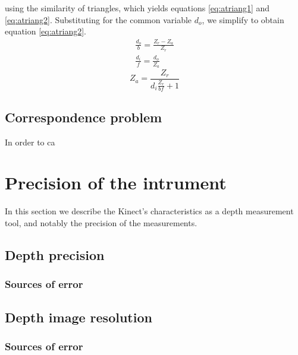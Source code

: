 using the similarity of triangles, which yields equations \ref{eq:atriang1} and
\ref{eq:atriang2}. Substituting for the common variable $d_o$, we simplify to
obtain equation \ref{eq:atriang2}.
\begin{align} 
    \frac{d_o}{b} = \frac{Z_r - Z_a}{Z_r} \label{eq:atriang1}\\
    \frac{d_i}{f} = \frac{d_o}{Z_a} \label{eq:atriang2}
\end{align}
\begin{equation} \label{eq:atriang2}
    Z_a = \frac{Z_r}{d_i \frac{Z_r}{b f} + 1}
\end{equation}

\subsection{Correspondence problem}
\label{sub:corr}

In order to ca






\section{Precision of the intrument}
\label{precision}

In this section we describe the Kinect's characteristics as a depth measurement
tool, and notably the precision of the measurements.


\subsection{Depth precision}

\subsubsection{Sources of error}

\subsection{Depth image resolution}

\subsubsection{Sources of error}
